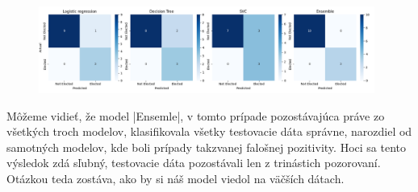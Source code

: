 \documentclass[main.tex]{subfiles}
\begin{document}
\begin{figure}[!htbp]
    \centering
    \includegraphics[width=0.98\textwidth]
    {images/confussion_matrix.png}
    \caption{}
    \label{fig:confussion_matrices}
\end{figure}
Môžeme vidieť, že model \pyth|Ensemle|, v tomto prípade pozostávajúca práve zo všetkých troch modelov, klasifikovala všetky testovacie dáta správne, narozdiel od samotných modelov, kde boli prípady takzvanej falošnej pozitivity. Hoci sa tento výsledok zdá sľubný, testovacie dáta pozostávali len z trinástich pozorovaní. Otázkou teda zostáva, ako by si náš model viedol na väčších dátach.
\end{document}
